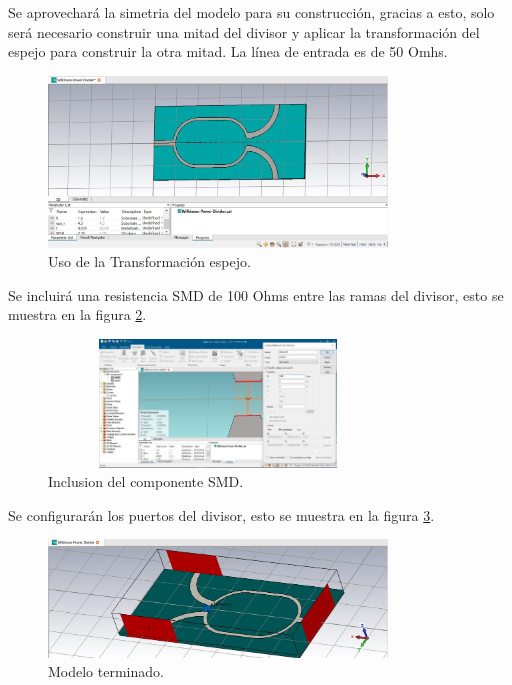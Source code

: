 \documentclass[a4paper]{IEEEtran} %
\begin{document}
Se aprovechará la simetria del modelo para su construcción, gracias a esto, solo será necesario construir una mitad del divisor y aplicar la transformación del espejo para construir la otra mitad. La línea de entrada es de 50 Omhs. 
\begin{figure}[h]    
    \centering
    \includegraphics[width=9cm]{imagenes/img9}
    \caption{Uso de la Transformación espejo.}
    \label{fig:modelamiento4}
\end{figure} 

Se incluirá una resistencia SMD de 100 Ohms entre las ramas del divisor, esto se muestra en la figura \ref{fig:modelamiento5}.
\begin{figure}[h]    
    \centering
    \includegraphics[width=9cm,height=3.403cm]{imagenes/img10}
    \caption{Inclusion del componente SMD.}
    \label{fig:modelamiento5}
\end{figure} 

Se configurarán los puertos del divisor, esto se muestra en la figura \ref{fig:modelamiento6}.
\begin{figure}[h]    
    \centering
    \includegraphics[width=9cm]{imagenes/img11}
    \caption{Modelo terminado.}
    \label{fig:modelamiento6}
\end{figure}
\end{document}
